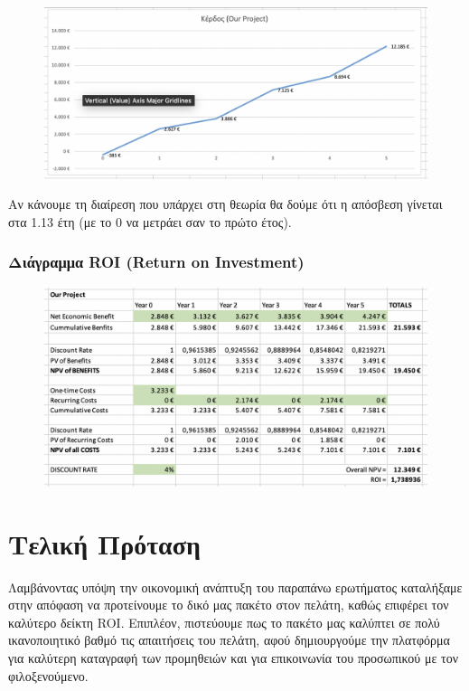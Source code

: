 \begin{figure}[H]
	\includegraphics[width=1\textwidth]{Images/4.2.8}
\end{figure}

\noindent
Αν κάνουμε τη διαίρεση που υπάρχει στη θεωρία θα δούμε ότι η απόσβεση 
γίνεται στα 1.13 έτη (με το 0 να μετράει σαν το πρώτο έτος).

\subsubsection{Διάγραμμα ROI (Return on Investment)}
\begin{figure}[H]
	\includegraphics[width=1\textwidth]{Images/4.2.9}
\end{figure}

\section{Τελική Πρόταση}
Λαμβάνοντας υπόψη την οικονομική ανάπτυξη του παραπάνω ερωτήματος καταλήξαμε 
στην απόφαση να προτείνουμε το δικό μας πακέτο στον πελάτη, καθώς επιφέρει τον 
καλύτερο δείκτη ROI. Επιπλέον, πιστεύουμε πως το πακέτο μας καλύπτει σε πολύ 
ικανοποιητικό βαθμό τις απαιτήσεις του πελάτη, αφού δημιουργούμε την πλατφόρμα 
για καλύτερη καταγραφή των προμηθειών και για επικοινωνία του προσωπικού με τον 
φιλοξενούμενο.  

